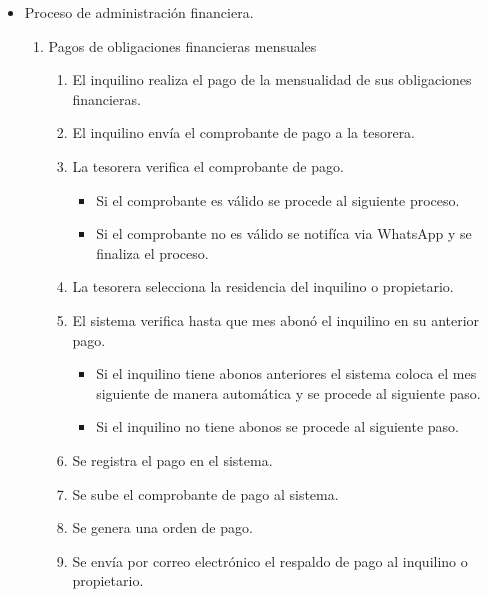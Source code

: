 \begin{itemize}
    \item Proceso de administración financiera.
    \begin{enumerate}
        \item Pagos de obligaciones financieras mensuales
        \begin{enumerate}
            \item El inquilino realiza el pago de la mensualidad de sus obligaciones financieras.
            \item El inquilino envía el comprobante de pago a la tesorera.
            \item La tesorera verifica el comprobante de pago.
            \begin{itemize}
                \item Si el comprobante es válido se procede al siguiente proceso.
                \item Si el comprobante no es válido se notifíca via WhatsApp y se finaliza el proceso.
            \end{itemize}
            \item La tesorera selecciona la residencia del inquilino o propietario.
            \item El sistema verifica hasta que mes abonó el inquilino en su anterior pago.
            \begin{itemize}
                \item Si el inquilino tiene abonos anteriores el sistema coloca el mes siguiente de manera automática y se procede al siguiente paso.
                \item Si el inquilino no tiene abonos se procede al siguiente paso.
            \end{itemize}
            \item Se registra el pago en el sistema.
            \item Se sube el comprobante de pago al sistema.
            \item Se genera una orden de pago.
            \item Se envía por correo electrónico el respaldo de pago al inquilino o propietario.
        \end{enumerate}
        \begin{figure}[H]
            \centering

\end{figure}
\end{enumerate}
\end{itemize}
